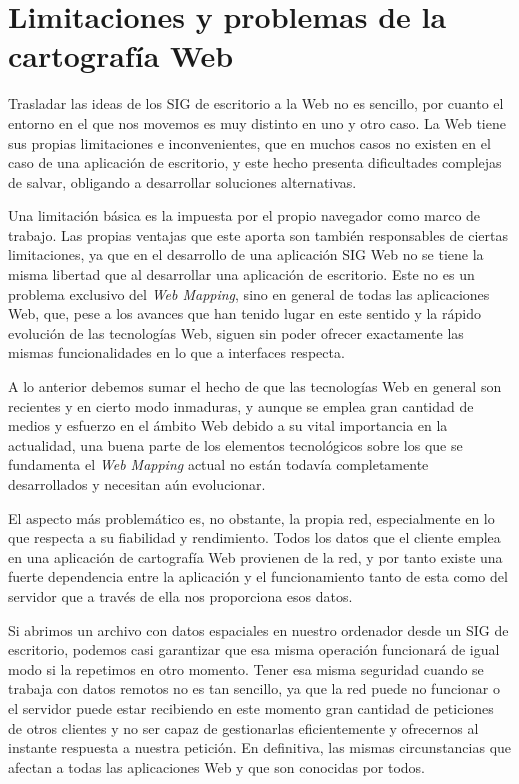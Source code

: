 
\section{Limitaciones y problemas de la cartografía Web}

Trasladar las ideas de los SIG de escritorio a la Web no es sencillo, por cuanto el entorno en el que nos movemos es muy distinto en uno y otro caso. La Web tiene sus propias limitaciones e inconvenientes, que en muchos casos no existen en el caso de una aplicación de escritorio, y este hecho presenta dificultades complejas de salvar, obligando a desarrollar soluciones alternativas.

Una limitación básica es la impuesta por el propio navegador como marco de trabajo. Las propias ventajas que este aporta son también responsables de ciertas limitaciones, ya que en el desarrollo de una aplicación SIG Web no se tiene la misma libertad que al desarrollar una aplicación de escritorio. Este no es un problema exclusivo del \emph{Web Mapping}, sino en general de todas las aplicaciones Web, que, pese a los avances que han tenido lugar en este sentido y la rápido evolución de las tecnologías Web, siguen sin poder ofrecer exactamente las mismas funcionalidades en lo que a interfaces respecta. 


A lo anterior debemos sumar el hecho de que las tecnologías Web en general son recientes y en cierto modo inmaduras, y aunque se emplea gran cantidad de medios y esfuerzo en el ámbito Web debido a su vital importancia en la actualidad, una buena parte de los elementos tecnológicos sobre los que se fundamenta el \emph{Web Mapping} actual no están todavía completamente desarrollados y necesitan aún evolucionar.

El aspecto más problemático es, no obstante, la propia red, especialmente en lo que respecta a su fiabilidad y rendimiento. Todos los datos que el cliente emplea en una aplicación de cartografía Web provienen de la red, y por tanto existe una fuerte dependencia entre la aplicación y el funcionamiento tanto de esta como del servidor que a través de ella nos proporciona esos datos.

Si abrimos un archivo con datos espaciales en nuestro ordenador desde un SIG de escritorio, podemos casi garantizar que esa misma operación funcionará de igual modo si la repetimos en otro momento. Tener esa misma seguridad cuando se trabaja con datos remotos no es tan sencillo, ya que la red puede no funcionar o el servidor puede estar recibiendo en este momento gran cantidad de peticiones de otros clientes y no ser capaz de gestionarlas eficientemente y ofrecernos al instante respuesta a nuestra petición. En definitiva, las mismas circunstancias que afectan a todas las aplicaciones Web y que son conocidas por todos.

